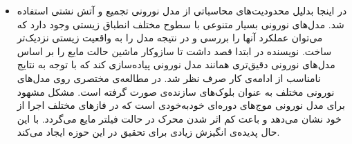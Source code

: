 \begin{itemize}
\item
در اینجا بدلیل محدودیت‌های محاسباتی از مدل نورونی تجمیع و آتش نشتی استفاده شد. مدل‌های نورونی بسیار متنوعی با سطوح مختلف انطباق زیستی وجود دارد که می‌توان عملکرد آنها را بررسی و در نتیجه مدل را به واقعیت زیستی نزدیک‌تر ساخت. نویسنده در ابتدا قصد داشت تا سازوکار ماشین حالت مایع را بر اساس مدل‌های نورونی دقیق‌تری همانند مدل نورونی  پیاده‌سازی کند که با توجه به نتایج نامناسب از ادامه‌ی کار صرف نظر شد. در \cite{grzyb2009model} مطالعه‌ی مختصری روی مدل‌های نورونی مختلف به عنوان بلوک‌های سازنده‌ی  صورت گرفته است. مشکل مشهود برای مدل نورونی  موج‌های دوره‌ای خود‌به‌خودی است که در فازهای مختلف اجرا از خود نشان می‌دهد و باعث کم اثر شدن محرک در حالت فیلتر مایع می‌گردد. با این حال پدیده‌ی  \cite{izhikevich2006polychronization} انگیزش زیادی برای تحقیق در این حوزه ایجاد می‌کند.
\end{itemize}

